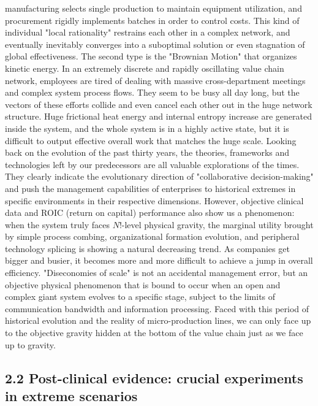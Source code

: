 \documentclass[11pt,a4paper]{article}
\begin{document}
manufacturing selects single production to maintain equipment utilization, and procurement rigidly implements batches in order to control costs. This kind of individual "local rationality" restrains each other in a complex network, and eventually inevitably converges into a suboptimal solution or even stagnation of global effectiveness. The second type is the "Brownian Motion" that organizes kinetic energy. In an extremely discrete and rapidly oscillating value chain network, employees are tired of dealing with massive cross-department meetings and complex system process flows. They seem to be busy all day long, but the vectors of these efforts collide and even cancel each other out in the huge network structure. Huge frictional heat energy and internal entropy increase are generated inside the system, and the whole system is in a highly active state, but it is difficult to output effective overall work that matches the huge scale. Looking back on the evolution of the past thirty years, the theories, frameworks and technologies left by our predecessors are all valuable explorations of the times. They clearly indicate the evolutionary direction of "collaborative decision-making" and push the management capabilities of enterprises to historical extremes in specific environments in their respective dimensions. However, objective clinical data and ROIC (return on capital) performance also show us a phenomenon: when the system truly faces $N!$-level physical gravity, the marginal utility brought by simple process combing, organizational formation evolution, and peripheral technology splicing is showing a natural decreasing trend. As companies get bigger and busier, it becomes more and more difficult to achieve a jump in overall efficiency. "Diseconomies of scale" is not an accidental management error, but an objective physical phenomenon that is bound to occur when an open and complex giant system evolves to a specific stage, subject to the limits of communication bandwidth and information processing. Faced with this period of historical evolution and the reality of micro-production lines, we can only face up to the objective gravity hidden at the bottom of the value chain just as we face up to gravity.


\subsection*{2.2 Post-clinical evidence: crucial experiments in extreme scenarios}
\end{document}
